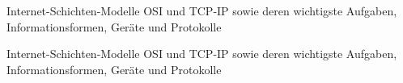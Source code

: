 

\thispagestyle{empty}
\begin{table}[H]
	\centering
	\footnotesize
	
	\label{table:osi-layers}
	\caption{Internet-Schichten-Modelle \gls{OSI} und \gls{TCP}-\gls{IP} sowie deren wichtigste Aufgaben, Informationsformen, Geräte und Protokolle}
\end{table}
\begin{table}[H]
	\centering
	\footnotesize
	
	\label{table:osi-layers}
	\caption{Internet-Schichten-Modelle \gls{OSI} und \gls{TCP}-\gls{IP} sowie deren wichtigste Aufgaben, Informationsformen, Geräte und Protokolle}
\end{table}
